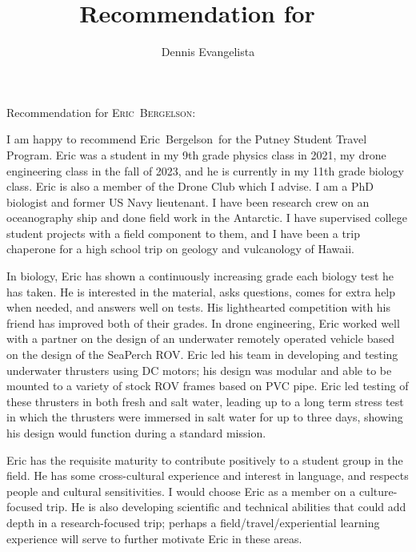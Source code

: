 \documentclass[12pt]{letter}
\title{Recommendation for \firstname\ \lastname}
\author{Dennis Evangelista}
\date{}
\newcommand\firstname{Eric}
\newcommand\lastname{Bergelson}
\begin{document}
\begin{letter}{%
}

\opening{Recommendation for {\scshape\firstname\ \lastname}:}

I am happy to recommend \firstname\ \lastname\ for the Putney Student Travel Program. Eric was a student in my 9th grade physics class in 2021, my drone engineering class in the fall of 2023, and he is currently in my 11th grade biology class. Eric is also a member of the Drone Club which I advise. I am a PhD biologist and former US Navy lieutenant. I have been research crew on an oceanography ship and done field work in the Antarctic. I have supervised college student projects with a field component to them, and I have been a trip chaperone for a high school trip on geology and vulcanology of Hawaii. 

In biology, Eric has shown a continuously increasing grade each biology test he has taken.  He is interested in the material, asks questions, comes for extra help when needed, and answers well on tests. His lighthearted competition with his friend has improved both of their grades. In drone engineering, Eric worked well with a partner on the design of an underwater remotely operated vehicle based on the design of the SeaPerch ROV.  Eric led his team in developing and testing underwater thrusters using DC motors; his design was modular and able to be mounted to a variety of stock ROV frames based on PVC pipe. Eric led testing of these thrusters in both fresh and salt water, leading up to a long term stress test in which the thrusters were immersed in salt water for up to three days, showing his design would function during a standard mission. 

Eric has the requisite maturity to contribute positively to a student group in the field. He has some cross-cultural experience and interest in language, and respects people and cultural sensitivities. I would choose Eric as a member on a culture-focused trip. He is also developing scientific and technical abilities that could add depth in a research-focused trip; perhaps a field/travel/experiential learning experience will serve to further motivate Eric in these areas. 

\noclosing

\end{letter}
\end{document}
